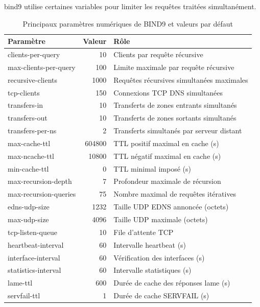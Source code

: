 \documentclass[12pt, a4paper]{report}
\begin{document}
	\noindent bind9 utilise certaines variables pour limiter les requêtes traitées simultanément. 

	\begin{table}[htbp]
	\centering
	\caption{Principaux paramètres numériques de BIND9 et valeurs par défaut}
	\label{tab:bind9_defaults}
	\begin{tabular}{l r l}
	\hline
	\textbf{Paramètre} & \textbf{Valeur} & \textbf{Rôle} \\
	\hline
	clients-per-query          & 10       & Clients par requête récursive \\
	max-clients-per-query      & 100      & Limite maximale par requête récursive \\
	recursive-clients          & 1000     & Requêtes récursives simultanées maximales \\
	tcp-clients                & 150      & Connexions TCP DNS simultanées \\
	transfers-in               & 10       & Transferts de zones entrants simultanés \\
	transfers-out              & 10       & Transferts de zones sortants simultanés \\
	transfers-per-ns           & 2        & Transferts simultanés par serveur distant \\
	max-cache-ttl              & 604800   & TTL positif maximal en cache (s) \\
	max-ncache-ttl             & 10800    & TTL négatif maximal en cache (s) \\
	min-cache-ttl              & 0        & TTL minimal imposé (s) \\
	max-recursion-depth        & 7        & Profondeur maximale de récursion \\
	max-recursion-queries      & 75       & Nombre maximal de requêtes itératives \\
	edns-udp-size              & 1232     & Taille UDP EDNS annoncée (octets) \\
	max-udp-size               & 4096     & Taille UDP maximale (octets) \\
	tcp-listen-queue           & 10       & File d'attente TCP \\
	heartbeat-interval         & 60       & Intervalle heartbeat (s) \\
	interface-interval         & 60       & Vérification des interfaces (s) \\
	statistics-interval        & 60       & Intervalle statistiques (s) \\
	lame-ttl                   & 600      & Durée de cache des réponses lame (s) \\
	servfail-ttl               & 1        & Durée de cache SERVFAIL (s) \\
	\hline
	\end{tabular}
	\end{table}
\end{document}
